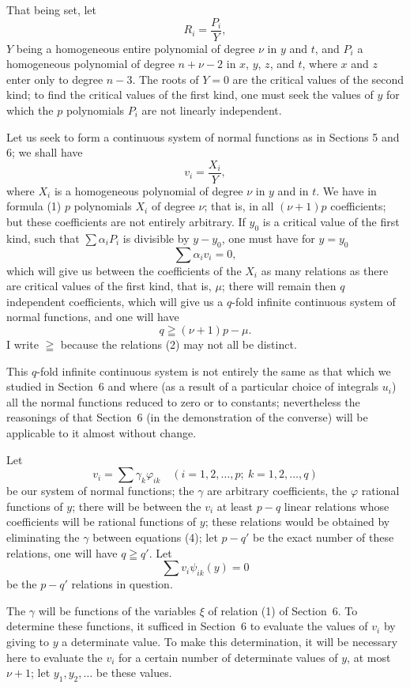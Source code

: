 \documentclass{article}
\begin{document}
That being set, let
\[
R_{i} = \frac{P_{i}}{Y},
\]
$Y$ being a homogeneous entire polynomial of degree $\nu$ in $y$ and $t$, and $P_{i}$ a homogeneous polynomial of degree $n + \nu - 2$ in $x$, $y$, $z$, and $t$, where $x$ and $z$ enter only to degree $n - 3$. The roots of $Y = 0$ are the critical values of the second kind; to find the critical values of the first kind, one must seek the values of $y$ for which the $p$ polynomials $P_{i}$ are not linearly independent.

Let us seek to form a continuous system of normal functions as in Sections 5 and 6; we shall have
\[
v_{i} = \frac{X_{i}}{Y}, \tag{1}
\]
where $X_{i}$ is a homogeneous polynomial of degree $\nu$ in $y$ and in $t$. We have in formula (1) $p$ polynomials $X_{i}$ of degree $\nu$; that is, in all $(\nu + 1)p$ coefficients; but these coefficients are not entirely arbitrary. If $y_{0}$ is a critical value of the first kind, such that $\displaystyle\sum \alpha_{i} P_{i}$ is divisible by $y - y_{0}$, one must have for $y = y_{0}$
\[
\sum \alpha_{i} v_{i} = 0, \tag{2}
\]
which will give us between the coefficients of the $X_{i}$ as many relations as there are critical values of the first kind, that is, $\mu$; there will remain then $q$ independent coefficients, which will give us a $q$-fold infinite continuous system of normal functions, and one will have
\[
q \geqq (\nu + 1)p - \mu. \tag{3}
\]
I write $\geqq$ because the relations (2) may not all be distinct.

This $q$-fold infinite continuous system is not entirely the same as that which we studied in Section~6 and where (as a result of a particular choice of integrals $u_{i}$) all the normal functions reduced to zero or to constants; nevertheless the reasonings of that Section~6 (in the demonstration of the converse) will be applicable to it almost without change.

Let
\[
v_{i} = \sum \gamma_{k}\varphi_{ik} \quad (i = 1, 2, \ldots, p; \ k = 1, 2, \ldots, q) \tag{4}
\]
be our system of normal functions; the $\gamma$ are arbitrary coefficients, the $\varphi$ rational functions of $y$; there will be between the $v_{i}$ at least $p - q$ linear relations whose coefficients will be rational functions of $y$; these relations would be obtained by eliminating the $\gamma$ between equations (4); let $p - q'$ be the exact number of these relations,
one will have $q \geqq q'$. Let
\[
\sum v_{i}\psi_{ik}(y) = 0 \tag{5}
\]
be the $p - q'$ relations in question.

The $\gamma$ will be functions of the variables $\xi$ of relation (1) of Section~6. To determine these functions, it sufficed in Section~6 to evaluate the values of $v_{i}$ by giving to $y$ a determinate value. To make this determination, it will be necessary here to evaluate the $v_{i}$ for a certain number of determinate values of $y$, at most $\nu + 1$; let $y_{1}, y_{2}, \ldots$ be these values.
\end{document}
